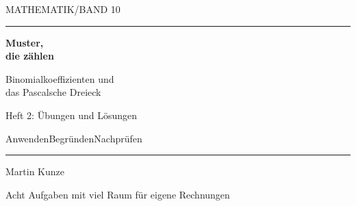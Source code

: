 \documentclass[a4paper,10pt]{article}
\begin{document}
\hypertarget{binomial.exercises}{}
{\sffamily\small MATHEMATIK\quad /\quad BAND 10}\par
\vspace{3mm}\hrule\vspace{9mm}
{\fontsize{29}{32}\selectfont\bfseries Muster,\\die zählen\par}
\vspace{6mm}
{\Large Binomialkoeffizienten und\\das Pascalsche Dreieck\par}
\vspace{3mm}
{\normalsize Heft 2: Übungen und Lösungen\par}
\vspace{6mm}
\begin{center}\end{center}
\vfill
{\sffamily\small Anwenden\quad\textbullet\quad Begründen\quad\textbullet\quad Nachprüfen\par}
\vspace{5mm}\hrule\vspace{3mm}
{\large Martin Kunze\par}
{\small Acht Aufgaben mit viel Raum für eigene Rechnungen\par}
\clearpage



\end{document}
